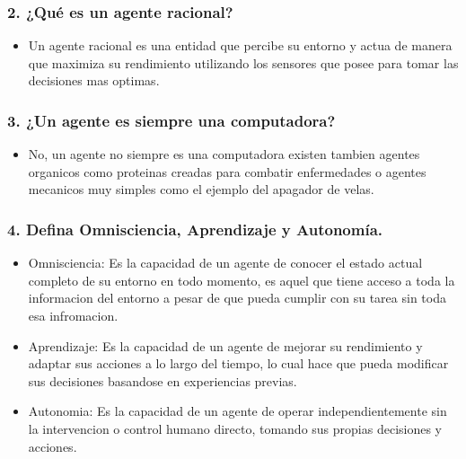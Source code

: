 \documentclass[11pt]{article}
\providecommand{\tightlist}{%
      \setlength{\itemsep}{0pt}\setlength{\parskip}{0pt}}
\begin{document}
    \subsubsection{2. ¿Qué es un agente
racional?}\label{quuxe9-es-un-agente-racional}

    \begin{itemize}
\tightlist
\item
  Un agente racional es una entidad que percibe su entorno y actua de
  manera que maximiza su rendimiento utilizando los sensores que posee
  para tomar las decisiones mas optimas.
\end{itemize}

    \subsubsection{3. ¿Un agente es siempre una
computadora?}\label{un-agente-es-siempre-una-computadora}

    \begin{itemize}
\tightlist
\item
  No, un agente no siempre es una computadora existen tambien agentes
  organicos como proteinas creadas para combatir enfermedades o agentes
  mecanicos muy simples como el ejemplo del apagador de velas.
\end{itemize}

    \subsubsection{4. Defina Omnisciencia, Aprendizaje y
Autonomía.}\label{defina-omnisciencia-aprendizaje-y-autonomuxeda.}

    \begin{itemize}
\item
  Omnisciencia: Es la capacidad de un agente de conocer el estado actual
  completo de su entorno en todo momento, es aquel que tiene acceso a
  toda la informacion del entorno a pesar de que pueda cumplir con su
  tarea sin toda esa infromacion.
\item
  Aprendizaje: Es la capacidad de un agente de mejorar su rendimiento y
  adaptar sus acciones a lo largo del tiempo, lo cual hace que pueda
  modificar sus decisiones basandose en experiencias previas.
\item
  Autonomia: Es la capacidad de un agente de operar independientemente
  sin la intervencion o control humano directo, tomando sus propias
  decisiones y acciones.
\end{itemize}
\end{document}

